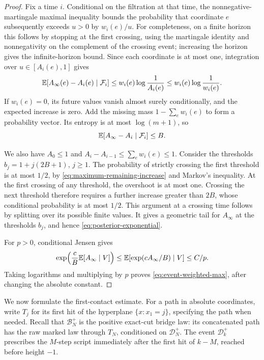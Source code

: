 \begin{proof}
Fix a time \(i\).  Conditional on the filtration at that time, the
nonnegative-martingale maximal inequality
\cite[Chapter~V, first section, \S2, Theorem~1]{Ville1939}
bounds the probability that
coordinate \(e\) subsequently exceeds \(u>0\) by \(w_i(e)/u\).
For completeness, on a finite horizon this follows by stopping at the
first crossing, using the martingale identity and nonnegativity on the
complement of the crossing event; increasing the horizon gives the
infinite-horizon bound.  Since each coordinate is at most one,
integration over \(u\in[A_i(e),1]\) gives
\[
 \mathbb E[A_\infty(e)-A_i(e)\mid\mathcal F_i]
 \le w_i(e)\log\frac1{A_i(e)}
 \le w_i(e)\log\frac1{w_i(e)}.
\]
If \(w_i(e)=0\), its future values vanish almost surely conditionally,
and the expected increase is zero.  Add the missing mass
\(1-\sum_e w_i(e)\) to form a probability vector.  Its entropy is at
most \(\log(m+1)\), so
\begin{equation}\label{eq:maximum-remaining-increase}
 \mathbb E[A_\infty-A_i\mid\mathcal F_i]\le B.
\end{equation}

We also have \(A_0\le1\) and
\(A_i-A_{i-1}\le\sum_e w_i(e)\le1\).
Consider the thresholds \(b_j=1+j(2B+1)\), \(j\ge1\).
The probability of strictly crossing the first threshold is at most
\(1/2\), by \eqref{eq:maximum-remaining-increase} and Markov's
inequality.  At the first crossing of any threshold, the overshoot is
at most one.  Crossing the next threshold therefore requires a further
increase greater than \(2B\), whose conditional probability is at most
\(1/2\).  This argument at a crossing time follows by splitting over
its possible finite values.  It gives a geometric tail for
\(A_\infty\) at the thresholds \(b_j\), and hence
\eqref{eq:posterior-exponential}.

For \(p>0\), conditional Jensen gives
\[
 \exp\!\left(\frac cB\mathbb E[A_\infty\mid V]\right)
 \le \mathbb E[\exp(cA_\infty/B)\mid V]\le C/p.
\]
Taking logarithms and multiplying by \(p\) proves
\eqref{eq:event-weighted-max}, after changing the absolute constant.
\end{proof}

We now formulate the first-contact estimate.  For a path in absolute
coordinates, write \(T_j\) for its first hit of the hyperplane
\(\{x:x_1=j\}\), specifying the path when needed.  Recall that
\(\mathcal B_N^+\) is the positive exact-cut bridge law: its
concatenated path has the raw marked law through \(T_N\), conditioned
on \(\mathcal D_N^+\).  The event \(\mathcal D_k^+\) prescribes the
\(M\)-step script immediately after the first hit of \(k-M\), reached
before height \(-1\).

